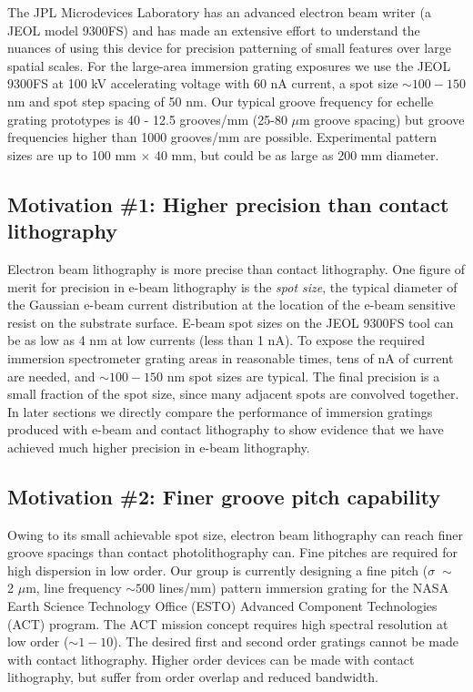 \documentclass[]{spie}  %
\begin{document}
The JPL Microdevices Laboratory has an advanced electron beam writer (a JEOL model 9300FS) and has made an extensive effort to understand the nuances of using this device for precision patterning of small features over large spatial scales.  For the large-area immersion grating exposures we use the JEOL 9300FS at 100 kV accelerating voltage with 60 nA current, a spot size $\sim 100-150$ nm and spot step spacing of 50 nm. Our typical groove frequency for echelle grating prototypes is 40 - 12.5 grooves/mm (25-80 $\mu$m groove spacing) but groove frequencies higher than 1000 grooves/mm are possible. Experimental pattern sizes are up to 100 mm $\times$ 40 mm, but could be as large as 200 mm diameter.

\subsection{Motivation \#1: Higher precision than contact lithography}
\label{sec:Precis}
Electron beam lithography is more precise than contact lithography.  One figure of merit for precision in e-beam lithography is the \emph{spot size}, the typical diameter of the Gaussian e-beam current distribution at the location of the e-beam sensitive resist on the substrate surface.  E-beam spot sizes on the JEOL 9300FS tool can be as low as 4 nm at low currents (less than 1 nA).  To expose the required immersion spectrometer grating areas in reasonable times, tens of nA of current are needed, and $\sim 100 - 150$ nm spot sizes are typical.  The final precision is a small fraction of the spot size, since many adjacent spots are convolved together.  In later sections we directly compare the performance of immersion gratings produced with e-beam and contact lithography to show evidence that we have achieved much higher precision in e-beam lithography.  

\subsection{Motivation \#2: Finer groove pitch capability}
Owing to its small achievable spot size, electron beam lithography can reach finer groove spacings than contact photolithography can.  Fine pitches are required for high dispersion in low order.  Our group is currently designing a fine pitch ($\sigma \; \sim$ 2 $\mu$m, line frequency $\sim 500$ lines/mm) pattern immersion grating for the NASA Earth Science Technology Office (ESTO) Advanced Component Technologies (ACT) program.  The ACT mission concept requires high spectral resolution at low order ($\sim1-10$).  The desired first and second order gratings cannot be made with contact lithography.  Higher order devices can be made with contact lithography, but suffer from order overlap and reduced bandwidth.
\end{document}

